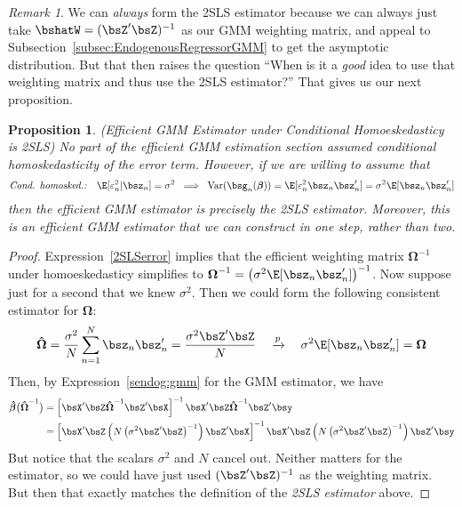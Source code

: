 \documentclass[12pt]{article}
\theoremstyle{plain}
\newtheorem{prop}[thm]{Proposition}
\theoremstyle{definition}
\theoremstyle{remark}
\newtheorem*{rmk}{Remark}
\newcommand{\bsbeta}{\boldsymbol{\beta}}
\newcommand{\bsOmega}{\boldsymbol{\Omega}}
\newcommand{\bshatbeta}{\boldsymbol{\hat{\beta}}}
\newcommand{\bshatOmega}{\boldsymbol{\hat{\Omega}}}
\newcommand{\Var}{\operatorname{Var}}
\newcommand{\pto}{\xrightarrow{p}}
\newcommand{\sumnN}{\sum^N_{n=1}}
\begin{document}
\begin{rmk}
We can \emph{always} form the 2SLS estimator because we can always just
take $\bshatW=(\bsZ'\bsZ)^{-1}$ as our GMM weighting matrix, and appeal
to Subsection~\ref{subsec:EndogenousRegressorGMM} to get the asymptotic
distribution.  But that then raises the question ``When is it a
\emph{good} idea to use that weighting matrix and thus use the 2SLS
estimator?'' That gives us our next proposition.
\end{rmk}


\begin{prop}
\emph{%
  (Efficient GMM Estimator under Conditional Homoeskedasticy is 2SLS)}
No part of the efficient GMM estimation section assumed conditional
homoskedasticity of the error term. However, if we are willing to assume
that
\begin{align}
  \text{\emph{Cond. homosked.:}}\quad
  \E[\varepsilon_n^2|\bsz_n] = \sigma^2
  \;\implies\;
  \Var(\bsg_n(\bsbeta))=
  \E[\varepsilon_n^2\bsz_n\bsz_n']
  = \sigma^2 \E[\bsz_n\bsz_n']
  \label{2SLSerror}
\end{align}
then the efficient GMM estimator is precisely the 2SLS estimator.
Moreover, this is an efficient GMM estimator that we can construct in
one step, rather than two.
\end{prop}

\begin{proof}
Expression~\ref{2SLSerror} implies that the efficient weighting matrix
$\bsOmega^{-1}$ under homoeskedasticy simplifies to
$\bsOmega^{-1}=\left(\sigma^2 \E[\bsz_n\bsz_n']\right)^{-1}$.
Now suppose just for a second that we knew $\sigma^2$. Then we could
form the following consistent estimator for $\bsOmega$:
\begin{align*}
  \bshatOmega
  = \frac{\sigma^2}{N} \sumnN \bsz_n\bsz_n'
  = \frac{\sigma^2\bsZ'\bsZ}{N}
  \quad\pto\quad
  \sigma^2 \E[\bsz_n\bsz_n']
  = \bsOmega
\end{align*}
Then, by Expression~\ref{sendog:gmm} for the GMM estimator, we have
\begin{align*}
  \bshatbeta\big(
  \bshatOmega^{-1}
  \big)
  &=
  \left[
  \bsX'\bsZ
  \bshatOmega^{-1}
  \bsZ'\bsX
  \right]^{-1}
  \bsX'\bsZ
  \bshatOmega^{-1}
  \bsZ'\bsy
  \\
  &=
  \left[
  \bsX'\bsZ
    \left(N\left(\sigma^2 \bsZ'\bsZ\right)^{-1}\right)
  \bsZ'\bsX
  \right]^{-1}
  \bsX'\bsZ\left(N\left(\sigma^2 \bsZ'\bsZ\right)^{-1}\right)\bsZ'\bsy
\end{align*}
But notice that the scalars $\sigma^2$ and $N$ cancel out. Neither
matters for the estimator, so we could have just used $(\bsZ'\bsZ)^{-1}$
as the weighting matrix. But then that exactly matches the definition of
the \emph{2SLS estimator} above.
\end{proof}
\end{document}
